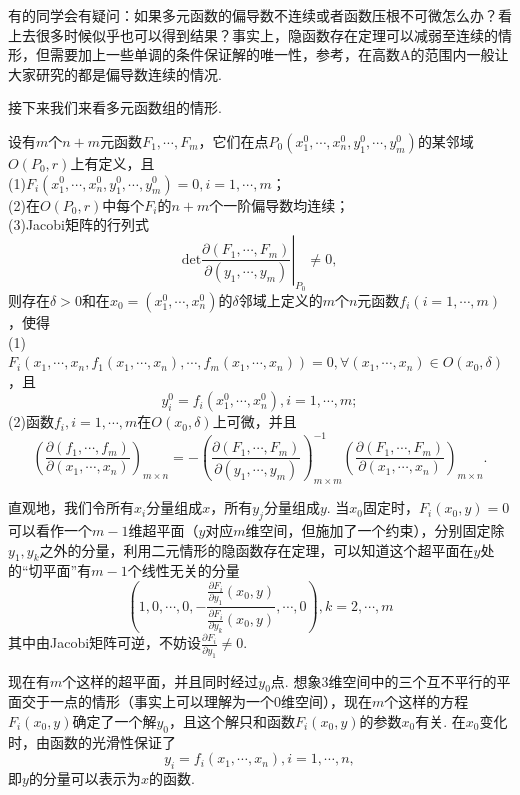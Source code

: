 \documentclass{ctexart}
\begin{document}
有的同学会有疑问：如果多元函数的偏导数不连续或者函数压根不可微怎么办？看上去很多时候似乎也可以得到结果？事实上，隐函数存在定理可以减弱至连续的情形，但需要加上一些单调的条件保证解的唯一性，参考\cite[命题20.1.2]{XHM}，在高数A的范围内一般让大家研究的都是偏导数连续的情况.

接下来我们来看多元函数组的情形.
\begin{theorem}
设有$m$个$n+m$元函数$F_{1},\cdots,F_{m}$，它们在点$P_{0}(x_{1}^{0},\cdots,x_{n}^{0},y_{1}^{0},\cdots,y_{m}^{0})$的某邻域$O(P_{0},r)$上有定义，且\\
(1)$F_{i}(x_{1}^{0},\cdots,x_{n}^{0},y_{1}^{0},\cdots,y_{m}^{0})=0,i=1,\cdots,m$；\\
(2)在$O(P_{0},r)$中每个$F_{i}$的$n+m$个一阶偏导数均连续；\\
(3)Jacobi矩阵的行列式
$$\left.\mathrm{det}\frac{\partial (F_{1},\cdots,F_{m})}{\partial (y_{1},\cdots,y_{m})}\right|_{P_{0}}\neq 0,$$
则存在$\delta>0$和在$x_{0}=(x_{1}^{0},\cdots,x_{n}^{0})$的$\delta$邻域上定义的$m$个$n$元函数$f_{i}(i=1,\cdots,m)$，使得\\
(1)$F_{i}(x_{1},\cdots,x_{n},f_{1}(x_{1},\cdots,x_{n}),\cdots,f_{m}(x_{1},\cdots,x_{n}))=0,\forall (x_{1},\cdots,x_{n})\in O(x_{0},\delta)$，且
$$y_{i}^{0}=f_{i}(x_{1}^{0},\cdots,x_{n}^{0}),i=1,\cdots,m;$$
(2)函数$f_{i},i=1,\cdots,m$在$O(x_{0},\delta)$上可微，并且
$$\left(\frac{\partial (f_{1},\cdots,f_{m})}{\partial (x_{1},\cdots,x_{n})}\right)_{m\times n}=-\left(\frac{\partial(F_{1},\cdots,F_{m})}{\partial (y_{1},\cdots,y_{m})}\right)_{m\times m}^{-1}\left(\frac{\partial (F_{1},\cdots,F_{m})}{\partial (x_{1},\cdots,x_{n})}\right)_{m\times n}.$$
\end{theorem}

直观地，我们令所有$x_{i}$分量组成$x$，所有$y_{j}$分量组成$y$. 当$x_{0}$固定时，$F_{i}(x_{0},y)=0$可以看作一个$m-1$维超平面（$y$对应$m$维空间，但施加了一个约束），分别固定除$y_{1},y_{k}$之外的分量，利用二元情形的隐函数存在定理，可以知道这个超平面在$y$处的“切平面”有$m-1$个线性无关的分量$$\left(1,0,\cdots,0,-\frac{\frac{\partial F_{i}}{\partial y_{1}}(x_{0},y)}{\frac{\partial F_{i}}{\partial y_{k}}(x_{0},y)},\cdots,0\right),k=2,\cdots,m$$
其中由Jacobi矩阵可逆，不妨设$\frac{\partial F_{i}}{\partial y_{1}}\neq 0$.

现在有$m$个这样的超平面，并且同时经过$y_{0}$点. 想象3维空间中的三个互不平行的平面交于一点的情形（事实上可以理解为一个0维空间），现在$m$个这样的方程$F_{i}(x_{0},y)$确定了一个解$y_{0}$，且这个解只和函数$F_{i}(x_{0},y)$的参数$x_{0}$有关. 在$x_{0}$变化时，由函数的光滑性保证了
$$y_{i}=f_{i}(x_{1},\cdots,x_{n}),i=1,\cdots,n,$$
即$y$的分量可以表示为$x$的函数.
\end{document}
